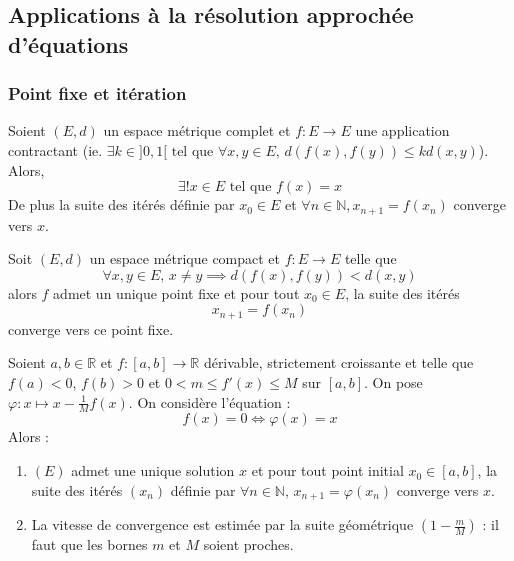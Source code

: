   \subsection{Applications à la résolution approchée d'équations}

  \subsubsection{Point fixe et itération}


  \begin{theorem}
    Soient $(E,d)$ un espace métrique complet et $f : E \rightarrow E$ une application contractant (ie. $\exists k \in ]0,1[ \text{ tel que } \forall x, y \in E, \, d(f(x), f(y)) \leq k d(x, y)$). Alors,
    \[ \exists! x \in E \text{ tel que } f(x) = x \]
    De plus la suite des itérés définie par $x_0 \in E$ et $\forall n \in \mathbb{N}, x_{n+1} = f(x_n)$ converge vers $x$.
  \end{theorem}

  \begin{theorem}
    Soit $(E,d)$ un espace métrique compact et $f : E \rightarrow E$ telle que
    \[ \forall x, y \in E, \, x \neq y \implies d(f(x), f(y)) < d(x,y) \]
    alors $f$ admet un unique point fixe et pour tout $x_0 \in E$, la suite des itérés
    \[ x_{n+1} = f(x_n) \]
    converge vers ce point fixe.
  \end{theorem}


  \begin{application}
    Soient $a, b \in \mathbb{R}$ et $f : [a, b] \rightarrow \mathbb{R}$ dérivable, strictement croissante et telle que $f(a) < 0$, $f(b) > 0$ et $0 < m \leq f'(x) \leq M$ sur $[a, b]$. On pose $\varphi : x \mapsto x - \frac{1}{M} f(x)$. On considère l'équation :
    \[ f(x) = 0 \iff \varphi(x) = x \tag{$E$} \]
    Alors :
    \begin{enumerate}[label=(\roman*)]
      \item $(E)$ admet une unique solution $x$ et pour tout point initial $x_0 \in [a, b]$, la suite des itérés $(x_n)$ définie par $\forall n \in \mathbb{N}, \, x_{n+1} = \varphi(x_n)$ converge vers $x$.
      \item La vitesse de convergence est estimée par la suite géométrique $\left( 1 - \frac{m}{M} \right)$ : il faut que les bornes $m$ et $M$ soient proches.
    \end{enumerate}
  \end{application}

